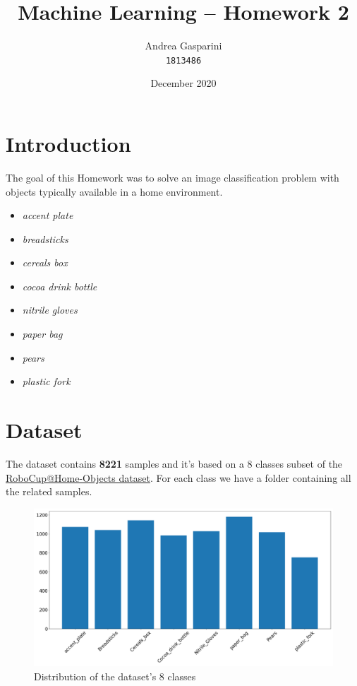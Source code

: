 \documentclass[11pt]{article}
\title{Machine Learning -- Homework 2}
\author{Andrea Gasparini \\ \texttt{1813486}}
\date{December 2020}
\begin{document}
	\maketitle

	\tableofcontents	

	\newpage


	\section{Introduction}
	The goal of this Homework was to solve an image classification problem with
	objects typically available in a home environment.

	\begin{multicols}{2}
		\begin{itemize}
			\item \textit{accent plate}
			\item \textit{breadsticks}
			\item \textit{cereals box}
			\item \textit{cocoa drink bottle}
			\item \textit{nitrile gloves}
			\item \textit{paper bag}
			\item \textit{pears}
			\item \textit{plastic fork}
		\end{itemize}
	\end{multicols}	



	\section{Dataset}
	The dataset contains \textbf{8221} samples and it's based on a 8 classes subset of the
	\href{https://sites.google.com/diag.uniroma1.it/robocupathome-objects/home}{RoboCup@Home-Objects dataset}.
	For each class we have a folder containing all the related samples.

	\begin{figure}[H]
		\centering
		\includegraphics[width=\textwidth]{assets/dataset.png}
		\caption{Distribution of the dataset's 8 classes}
	\end{figure}
\end{document}
